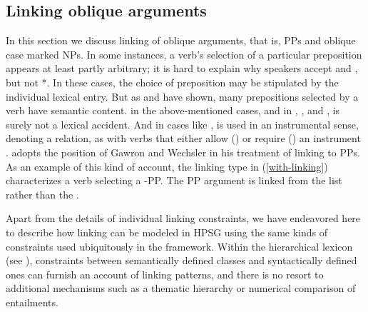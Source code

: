 \documentclass[output=paper,biblatex,babelshorthands,newtxmath,draftmode,colorlinks, citecolor=brown]{langscibook}
\begin{document}
\subsection{Linking oblique arguments}
In this section we discuss linking of oblique arguments, that is, PPs and oblique case marked NPs.
In some instances, a verb's selection of a particular preposition appears at least partly arbitrary;
it is hard to explain why  speakers accept  and , but  not *.
In these cases, the choice of preposition may be stipulated by the individual lexical entry.
But as \citet{Gawron1986} and \citet{Wechsler1995} have shown, many prepositions selected by a verb have semantic content.
 in the above-mentioned cases, and in , , and , is surely not a lexical accident.
And in  cases like ,  is used in an instrumental sense, denoting a  relation, as with verbs that either allow () or require () an instrument \citep{KoenigandDavis2006}.
\citet{Davis1996,Davis2001} adopts the position of Gawron and Wechsler in his treatment of linking to PPs.
As an example of this kind of account, the linking type in (\ref{with-linking}) characterizes a verb selecting a -PP. 
The PP argument is linked from the \rels list rather than the .

\begin{exe}\ex\label{with-linking}
\end{exe} 


Apart from the details of individual linking constraints, we have endeavored here to describe how
linking can be modeled in HPSG using the same kinds of constraints used ubiquitously in the
framework.  Within the hierarchical lexicon (see ), constraints between
semantically defined classes and syntactically defined ones can furnish an account of linking
patterns, and there is no resort to additional mechanisms such as a thematic hierarchy or numerical comparison of entailments.%
%
\end{document}
